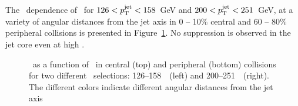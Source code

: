 The \pt\ dependence of \RDptr\ for \mbox{$126 < \mbox{$p_{\mathrm{T}}^{\mathrm{jet}}$} < 158$ GeV} and \mbox{$200 < \mbox{$p_{\mathrm{T}}^{\mathrm{jet}}$} < 251$ GeV}, at a variety of angular distances from the jet axis in 0 -- 10\% central and 60 -- 80\% peripheral collisions is presented in Figure~\ref{fig:pttrkdep}. No suppression is observed in the jet core even at high \pt. 


\begin{figure}
   \caption{\RDptr\ as a function of \pt\ in central (top) and peripheral (bottom) collisions for two different \ptjet\ selections: 126--158~\GeV\ (left) and 200--251~\GeV\ (right). The different colors indicate different angular distances from the jet axis}
      \label{fig:pttrkdep}
\end{figure}






\FloatBarrier
